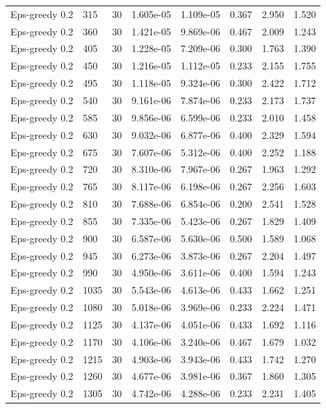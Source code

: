 \begin{scriptsize}
\begin{longtable}{llrrrrrr}
Eps-greedy 0.2 & 315 & 30 & 1.605e-05 & 1.109e-05 & 0.367 & 2.950 & 1.520 \\
Eps-greedy 0.2 & 360 & 30 & 1.421e-05 & 9.869e-06 & 0.467 & 2.009 & 1.243 \\
Eps-greedy 0.2 & 405 & 30 & 1.228e-05 & 7.209e-06 & 0.300 & 1.763 & 1.390 \\
Eps-greedy 0.2 & 450 & 30 & 1.216e-05 & 1.112e-05 & 0.233 & 2.155 & 1.755 \\
Eps-greedy 0.2 & 495 & 30 & 1.118e-05 & 9.324e-06 & 0.300 & 2.422 & 1.712 \\
Eps-greedy 0.2 & 540 & 30 & 9.161e-06 & 7.874e-06 & 0.233 & 2.173 & 1.737 \\
Eps-greedy 0.2 & 585 & 30 & 9.856e-06 & 6.599e-06 & 0.233 & 2.010 & 1.458 \\
Eps-greedy 0.2 & 630 & 30 & 9.032e-06 & 6.877e-06 & 0.400 & 2.329 & 1.594 \\
Eps-greedy 0.2 & 675 & 30 & 7.607e-06 & 5.312e-06 & 0.400 & 2.252 & 1.188 \\
Eps-greedy 0.2 & 720 & 30 & 8.310e-06 & 7.967e-06 & 0.267 & 1.963 & 1.292 \\
Eps-greedy 0.2 & 765 & 30 & 8.117e-06 & 6.198e-06 & 0.267 & 2.256 & 1.603 \\
Eps-greedy 0.2 & 810 & 30 & 7.688e-06 & 6.854e-06 & 0.200 & 2.541 & 1.528 \\
Eps-greedy 0.2 & 855 & 30 & 7.335e-06 & 5.423e-06 & 0.267 & 1.829 & 1.409 \\
Eps-greedy 0.2 & 900 & 30 & 6.587e-06 & 5.630e-06 & 0.500 & 1.589 & 1.068 \\
Eps-greedy 0.2 & 945 & 30 & 6.273e-06 & 3.873e-06 & 0.267 & 2.204 & 1.497 \\
Eps-greedy 0.2 & 990 & 30 & 4.950e-06 & 3.611e-06 & 0.400 & 1.594 & 1.243 \\
Eps-greedy 0.2 & 1035 & 30 & 5.543e-06 & 4.613e-06 & 0.433 & 1.662 & 1.251 \\
Eps-greedy 0.2 & 1080 & 30 & 5.018e-06 & 3.969e-06 & 0.233 & 2.224 & 1.471 \\
Eps-greedy 0.2 & 1125 & 30 & 4.137e-06 & 4.051e-06 & 0.433 & 1.692 & 1.116 \\
Eps-greedy 0.2 & 1170 & 30 & 4.106e-06 & 3.240e-06 & 0.467 & 1.679 & 1.032 \\
Eps-greedy 0.2 & 1215 & 30 & 4.903e-06 & 3.943e-06 & 0.433 & 1.742 & 1.270 \\
Eps-greedy 0.2 & 1260 & 30 & 4.677e-06 & 3.981e-06 & 0.367 & 1.860 & 1.305 \\
Eps-greedy 0.2 & 1305 & 30 & 4.742e-06 & 4.288e-06 & 0.233 & 2.231 & 1.405 \\

\end{longtable}
\end{scriptsize}
